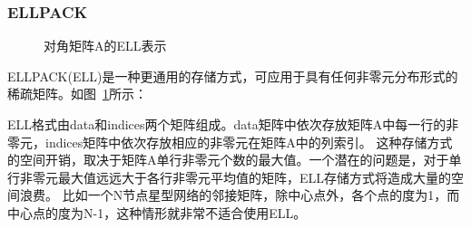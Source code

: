 \documentclass[11pt,twocolumn]{article}
\begin{document}
\subsubsection{ELLPACK}
\begin{figure} 
  \centering 
  \hspace{3in} 
  \caption{对角矩阵A的ELL表示} 
  \label{fig:ELL} %
\end{figure}
ELLPACK(ELL)是一种更通用的存储方式，可应用于具有任何非零元分布形式的稀疏矩阵。如图~\ref{fig:ELL}所示：

ELL格式由data和indices两个矩阵组成。data矩阵中依次存放矩阵A中每一行的非零元，indices矩阵中依次存放相应的非零元在矩阵A中的列索引。
这种存储方式的空间开销，取决于矩阵A单行非零元个数的最大值。一个潜在的问题是，对于单行非零元最大值远远大于各行非零元平均值的矩阵，ELL存储方式将造成大量的空间浪费。
比如一个N节点星型网络的邻接矩阵，除中心点外，各个点的度为1，而中心点的度为N-1，这种情形就非常不适合使用ELL。
\end{document}
